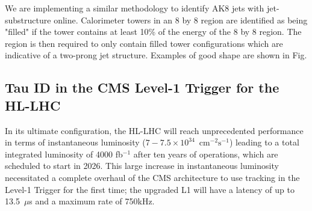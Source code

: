 \documentclass[preprint,12pt]{elsarticle}
\begin{document}
We are implementing a similar methodology to identify AK8 jets with jet-substructure
online. Calorimeter towers in an 8 by 8 region are identified as being "filled" if the tower contains at least 10\% of the energy of the 8 by 8 region.  
The region is then required to only contain filled tower configurations which are indicative
of a two-prong jet structure. Examples of good shape are shown in Fig. %



\subsection{Tau ID in the CMS Level-1 Trigger for the HL-LHC}
In its ultimate configuration, the HL-LHC will reach unprecedented performance in terms of instantaneous 
luminosity ($7-7.5 \times10^{34}$~$\mathrm{cm}^{-2}\mathrm{s}^{-1}$) 
leading to a total integrated luminosity of 4000 fb$^{-1}$ after ten years of
operations, which are scheduled to start in 2026.
This large increase in instantaneous luminosity necessitated a complete overhaul 
of the CMS architecture to use tracking in the Level-1 Trigger for the first time;
the upgraded L1 will have a latency of up to 13.5~$\mu$s and a maximum rate of 750kHz.
\end{document}
